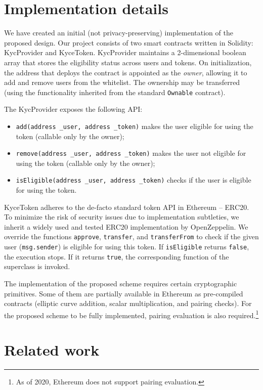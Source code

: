 \section{Implementation details}

We have created an initial (not privacy-preserving) implementation of the proposed design.
Our project consists of two smart contracts written in Solidity: KycProvider and KyceToken.
KycProvider maintains a 2-dimensional boolean array that stores the eligibility status across users and tokens.
On initialization, the address that deploys the contract is appointed as the \textit{owner}, allowing it to add and remove users from the whitelist.
The ownership may be transferred (using the functionality inherited from the standard \texttt{Ownable} contract).

The KycProvider exposes the following API:

\begin{itemize}
	\item \texttt{add(address \_user, address \_token)} makes the user eligible for using the token (callable only by the owner);
	\item \texttt{remove(address \_user, address \_token)} makes the user not eligible for using the token (callable only by the owner);
	\item \texttt{isEligible(address \_user, address \_token)} checks if the user is eligible for using the token.
\end{itemize}

KyceToken adheres to the de-facto standard token API in Ethereum -- ERC20.
To minimize the risk of security issues due to implementation subtleties, we inherit a widely used and tested ERC20 implementation by OpenZeppelin.
We override the functions \texttt{approve}, \texttt{transfer}, and \texttt{transferFrom} to check if the given user (\texttt{msg.sender}) is eligible for using this token.
If \texttt{isEligible} returns \texttt{false}, the execution stops.
If it returns \texttt{true}, the corresponding function of the superclass is invoked.

The implementation of the proposed scheme requires certain cryptographic primitives.
Some of them are partially available in Ethereum as pre-compiled contracts (elliptic curve addition, scalar multiplication, and pairing checks).
For the proposed scheme to be fully implemented, pairing evaluation is also required.\footnote{As of 2020, Ethereum does not support pairing evaluation.}


\section{Related work}

